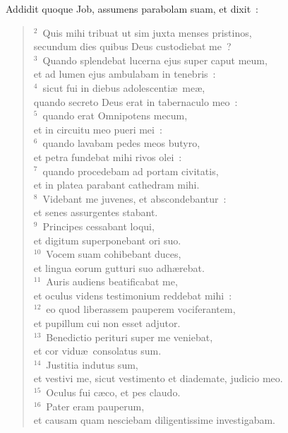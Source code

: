 \lettrine[lines=10,image=true,loversize=0.05,lraise=-0.03]{A}{}ddidit quoque Job, assumens parabolam suam, et dixit~:
\begin{flushleft}\begin{verse}\vspace{6pt}${}^{2}$~Quis mihi tribuat ut sim juxta menses pristinos,\\ secundum dies quibus Deus custodiebat me~?\\
${}^{3}$~Quando splendebat lucerna ejus super caput meum,\\ et ad lumen ejus ambulabam in tenebris~:\\
${}^{4}$~sicut fui in diebus adolescenti\ae\ me\ae ,\\ quando secreto Deus erat in tabernaculo meo~:\\
${}^{5}$~quando erat Omnipotens mecum,\\ et in circuitu meo pueri mei~:\\
${}^{6}$~quando lavabam pedes meos butyro,\\ et petra fundebat mihi rivos olei~:\\
${}^{7}$~quando procedebam ad portam civitatis,\\ et in platea parabant cathedram mihi.\\
${}^{8}$~Videbant me juvenes, et abscondebantur~:\\ et senes assurgentes stabant.\\
${}^{9}$~Principes cessabant loqui,\\ et digitum superponebant ori suo.\\
${}^{10}$~Vocem suam cohibebant duces,\\ et lingua eorum gutturi suo adh\ae rebat.\\
${}^{11}$~Auris audiens beatificabat me,\\ et oculus videns testimonium reddebat mihi~:\\
${}^{12}$~eo quod liberassem pauperem vociferantem,\\ et pupillum cui non esset adjutor.\\
${}^{13}$~Benedictio perituri super me veniebat,\\ et cor vidu\ae\ consolatus sum.\\
${}^{14}$~Justitia indutus sum,\\ et vestivi me, sicut vestimento et diademate, judicio meo.\\
${}^{15}$~Oculus fui c\ae co, et pes claudo.\\
${}^{16}$~Pater eram pauperum,\\ et causam quam nesciebam diligentissime investigabam.\\

\end{verse}
\end{flushleft}
